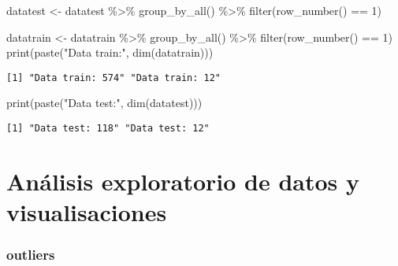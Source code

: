 \documentclass[
  letterpaper,
  DIV=11,
  numbers=noendperiod]{scrreprt}
\newenvironment{Shaded}{\begin{snugshade}}{\end{snugshade}}
\newcommand{\DecValTok}[1]{\textcolor[rgb]{0.68,0.00,0.00}{#1}}
\newcommand{\FunctionTok}[1]{\textcolor[rgb]{0.28,0.35,0.67}{#1}}
\newcommand{\NormalTok}[1]{\textcolor[rgb]{0.00,0.23,0.31}{#1}}
\newcommand{\OtherTok}[1]{\textcolor[rgb]{0.00,0.23,0.31}{#1}}
\newcommand{\SpecialCharTok}[1]{\textcolor[rgb]{0.37,0.37,0.37}{#1}}
\newcommand{\StringTok}[1]{\textcolor[rgb]{0.13,0.47,0.30}{#1}}
\begin{document}
\begin{Shaded}
\begin{Highlighting}[]
\NormalTok{datatest }\OtherTok{\textless{}{-}}\NormalTok{ datatest }\SpecialCharTok{\%\textgreater{}\%}
  \FunctionTok{group\_by\_all}\NormalTok{() }\SpecialCharTok{\%\textgreater{}\%}
  \FunctionTok{filter}\NormalTok{(}\FunctionTok{row\_number}\NormalTok{() }\SpecialCharTok{==} \DecValTok{1}\NormalTok{)}

\NormalTok{datatrain }\OtherTok{\textless{}{-}}\NormalTok{ datatrain }\SpecialCharTok{\%\textgreater{}\%}
  \FunctionTok{group\_by\_all}\NormalTok{() }\SpecialCharTok{\%\textgreater{}\%}
  \FunctionTok{filter}\NormalTok{(}\FunctionTok{row\_number}\NormalTok{() }\SpecialCharTok{==} \DecValTok{1}\NormalTok{)}
\FunctionTok{print}\NormalTok{(}\FunctionTok{paste}\NormalTok{(}\StringTok{"Data train:"}\NormalTok{, }\FunctionTok{dim}\NormalTok{(datatrain)))}
\end{Highlighting}
\end{Shaded}

\begin{verbatim}
[1] "Data train: 574" "Data train: 12" 
\end{verbatim}

\begin{Shaded}
\begin{Highlighting}[]
\FunctionTok{print}\NormalTok{(}\FunctionTok{paste}\NormalTok{(}\StringTok{"Data test:"}\NormalTok{, }\FunctionTok{dim}\NormalTok{(datatest)))}
\end{Highlighting}
\end{Shaded}

\begin{verbatim}
[1] "Data test: 118" "Data test: 12" 
\end{verbatim}


\hypertarget{anuxe1lisis-exploratorio-de-datos-y-visualisaciones}{%
\chapter{Análisis exploratorio de datos y
visualisaciones}\label{anuxe1lisis-exploratorio-de-datos-y-visualisaciones}}

\hypertarget{outliers}{%
\subsection{outliers}\label{outliers}}

\end{document}
